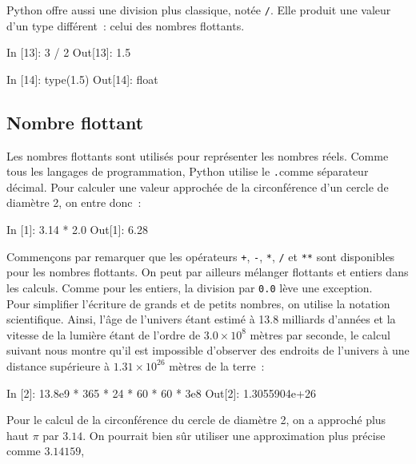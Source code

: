 \documentclass{magnoliaold}
\begin{document}
Python offre aussi une division plus classique, notée \verb_/_. Elle produit
une valeur d'un type différent~: celui des nombres flottants.

\begin{pythoncode}
In [13]: 3 / 2
Out[13]: 1.5

In [14]: type(1.5)
Out[14]: float
\end{pythoncode}

\subsection{Nombre flottant}

Les nombres flottants sont utilisés pour représenter les nombres réels. Comme tous
les langages de programmation, Python utilise le \og\verb_._\fg comme séparateur décimal.
Pour calculer une valeur approchée de la circonférence d'un cercle de diamètre 2, on entre
donc~:

\begin{pythoncode}
In [1]: 3.14 * 2.0
Out[1]: 6.28
\end{pythoncode}

\noindent Commençons par remarquer que les opérateurs \verb!+!, \verb!-!, \verb!*!, \verb!/! 
et \verb!**! sont
disponibles pour les nombres flottants. On peut par ailleurs mélanger flottants et
entiers dans les calculs. Comme pour les entiers, la division par \verb_0.0_ lève une
exception.\\

Pour simplifier l'écriture de grands et de petits nombres, on utilise la notation
scientifique. Ainsi, l'âge de l'univers étant estimé à 13.8 milliards d'années et la vitesse
de la lumière étant de l'ordre de $3.0\times 10^8$ mètres par seconde,
le calcul suivant nous montre qu'il est impossible
d'observer des endroits de l'univers à une distance supérieure à $1.31\times 10^{26}$
mètres de la terre~:

\begin{pythoncode}
In [2]: 13.8e9 * 365 * 24 * 60 * 60 * 3e8
Out[2]: 1.3055904e+26
\end{pythoncode}

Pour le calcul de la circonférence du cercle de diamètre 2, on a approché plus haut $\pi$ par $3.14$.
On pourrait bien sûr utiliser une approximation plus précise comme $3.14159$,
\end{document}
